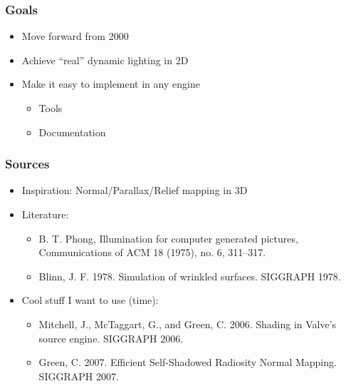 \documentclass{beamer}
\begin{document}
\begin{frame}\frametitle{Goals}

\begin{itemize}
\item
  Move forward from 2000
\item
  Achieve ``real'' dynamic lighting in 2D
\item
  Make it easy to implement in any engine

  \begin{itemize}
  \item
    Tools
  \item
    Documentation
  \end{itemize}
\end{itemize}

\end{frame}

\begin{frame}\frametitle{Sources}

\begin{itemize}
\item
  Inspiration: Normal/Parallax/Relief mapping in 3D
\item
  Literature:

  \begin{itemize}
  \item
    B. T. Phong, Illumination for computer generated pictures,
    Communications of ACM 18 (1975), no. 6, 311--317.
  \item
    Blinn, J. F. 1978. Simulation of wrinkled surfaces. SIGGRAPH 1978.
  \end{itemize}
\item
  Cool stuff I want to use (time):

  \begin{itemize}
  \item
    Mitchell, J., McTaggart, G., and Green, C. 2006. Shading in Valve's
    source engine. SIGGRAPH 2006.
  \item
    Green, C. 2007. Efficient Self-Shadowed Radiosity Normal Mapping.
    SIGGRAPH 2007.
  \end{itemize}
\end{itemize}

\end{frame}
\end{document}
